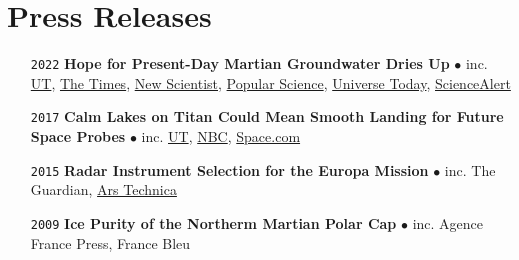 \section*{Press Releases}

\begin{itemize}[leftmargin=3.8em, labelsep=1.5em]
    \setlength\itemsep{-.5em}
    \item[\texttt{2022}] \textbf{Hope for Present-Day Martian Groundwater Dries Up} $\bullet$ inc. \href{https://news.utexas.edu/2022/01/24/hope-for-present-day-martian-groundwater-dries-up/}{UT}, \href{https://www.thetimes.co.uk/article/hope-dries-up-of-water-on-mars-qngbmwdgp}{The Times}, \href{https://www.newscientist.com/article/2305601-mars-lake-may-actually-be-volcanic-rocks-buried-beneath-the-ice-cap/}{New Scientist}, \href{https://www.popsci.com/science/liquid-water-on-mars-debate/}{Popular Science}, \href{https://www.universetoday.com/154242/is-the-underground-lake-on-mars-just-volcanic-rock/#more-154242}{Universe Today}, \href{https://www.sciencealert.com/liquid-water-detected-under-mars-polar-ice-cap-was-probably-just-rock-new-study-reveals}{ScienceAlert}
    \item[\texttt{2017}] \textbf{Calm Lakes on Titan Could Mean Smooth Landing for Future Space Probes} $\bullet$ inc. \href{https://news.utexas.edu/2017/07/06/calm-lakes-on-titan/}{UT}, \href{https://www.nbcnews.com/mach/science/you-can-forget-about-surfing-saturn-s-moon-titan-here-ncna780711}{NBC}, \href{https://www.space.com/37417-saturn-moon-titan-calm-seas-cassini.html}{Space.com}
    \item[\texttt{2015}] \textbf{Radar Instrument Selection for the Europa Mission} $\bullet$ inc. The Guardian, \href{https://arstechnica.com/science/2015/11/attempt-no-landing-there-yeah-right-were-going-to-europa/}{Ars Technica}
    \item[\texttt{2009}] \textbf{Ice Purity of the Northerm Martian Polar Cap} $\bullet$ inc. Agence France Press, France Bleu
\end{itemize}